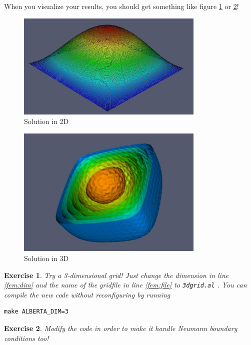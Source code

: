 \documentclass[11pt,a4paper,headinclude,footinclude,DIV16,normalheadings]{scrreprt}
\newtheorem{exc}{Exercise}[chapter]
\begin{document}
When you visualize your results, you should get something like figure \ref{Fig:FEM1} or \ref{Fig:FEM2}!

\begin{figure}
\centering
\includegraphics[width=0.8\textwidth]{./EPS/fem2d} 
\caption{Solution in 2D}
\label{Fig:FEM1}
\end{figure}

\begin{figure}
\centering
\includegraphics[width=0.8\textwidth]{./EPS/fem3d} 
\caption{Solution in 3D}
\label{Fig:FEM2}
\end{figure}

\begin{exc}
 Try a 3-dimensional grid! Just change the dimension in line \ref{fem:dim} and the name of the gridfile in line \ref{fem:file} to \lstinline!3dgrid.al! . You can compile the new code without reconfiguring by running
\begin{lstlisting}
make ALBERTA_DIM=3
\end{lstlisting}
\end{exc}

\begin{exc}
 Modify the code in order to make it handle Neumann boundary conditions too!
\end{exc}
\end{document}
